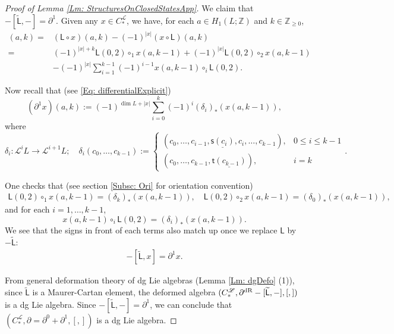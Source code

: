 \documentclass[10pt]{amsart}
\numberwithin{equation}{section}
\theoremstyle{plain}
\theoremstyle{definition}
\theoremstyle{remark}
\numberwithin{equation}{section}
\newcommand{\Z}{\mathbb{Z}}
\newcommand{\wt}[1]{\widetilde{#1}}
\newcommand{\dR}{\textup{dR}}
\newcommand{\CFr}{C_*^\mathscr{L}}
\newcommand{\LL}{\textsf{L}}
\begin{document}
{\begin{proof}[Proof of Lemma \ref{Lm: StructuresOnClosedStatesApp}]
We claim that $-[\wt{\LL}, -] = \partial^1$.
Given any $x\in \CFr$, we have, for each $a\in H_1(L;\Z)$ and $k\in\Z_{\geq 0}$,
\begin{align*}
	[\LL, x](a,k)  =& (\LL \circ x)(a,k) - (-1)^{|x|} (x\circ \LL)(a,k) \\
	=& (-1)^{|x|+k} \LL(0,2)\circ_1 x(a,k-1) + (-1)^{|x|} \LL(0,2)\circ_2 x(a,k-1)\\
	&-(-1)^{|x|}\sum_{i=1}^{k-1} (-1)^{i-1} x(a,k-1)\circ_i \LL(0,2).
\end{align*}


Now recall that (see \eqref{Eq: differentialExplicit}) 
\[(\partial^1 x)(a,k):= 
	(-1)^{\dim L + |x|}\sum_{i=0}^k (-1)^i(\delta_i)_*(x(a,k-1)),\]where 
		\[\delta_i \colon \mathscr{L}^{i}L\to \mathscr{L}^{i+1} L; \quad \delta_i(c_0,\dots, c_{k-1}):= \begin{cases}
		(c_0,\dots, c_{i-1},\underline{\textsf{s}(c_i)}, c_i,\dots, c_{k-1}), & 0 \leq i \leq k-1\\
		(c_0,\dots, c_{k-1}, \underline{\textsf{t}(c_{k-1})}), & i=k
	\end{cases}.
	\]

	
	One checks that  (see section \ref{Subsc: Ori} for orientation convention)
	\begin{align*}
		\LL(0,2) \circ_1 x(a,k-1) = (\delta_k)_*(x(a,k-1)),\quad \LL(0,2)\circ_2 x(a,k-1) = (\delta_0)_*(x(a,k-1)),
	\end{align*}
	and for each $i=1,\dots, k-1$, \[ x(a,k-1) \circ_i \LL(0,2) = (\delta_i)_*(x(a,k-1)). \]
	We see that the signs in front of each terms also match up once we replace $\LL$ by $-\wt{\LL}$:
	\begin{align}\label{Eq: [L,-]=delta}
		-[\wt{\LL}, x] =   \partial^1 x.
	\end{align}







From general deformation theory of dg Lie algebras 
(Lemma \ref{Lm: dgDefo} (1)), since $\wt{\LL}$ is a Maurer-Cartan element, the deformed algebra $(\CFr,\partial^\dR- [\wt{\LL},-], [,])$ is a dg Lie algebra. Since $-[\wt{\LL},-] = \partial^1$, we can conclude that $(\CFr, \partial=\partial^0+\partial^1, [,])$ is a dg Lie algebra.
\end{proof}

}
\end{document}

